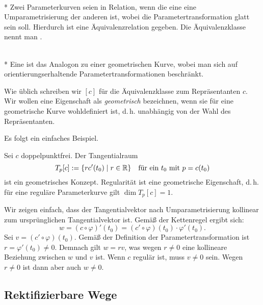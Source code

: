 \begin{definition}\mbox{}\\*
Zwei Parameterkurven seien in Relation, wenn die eine eine
Umparametrisierung der anderen ist, wobei die Parametertransformation
glatt sein soll. Hierdurch ist eine 
Äquivalenzrelation gegeben. Die Äquivalenzklasse nennt man
.
\end{definition}

\begin{definition}%
\mbox{}\\*
Eine  ist das Analogon zu einer
geometrischen Kurve, wobei man sich auf orientierungserhaltende
Parametertransformationen beschränkt.
\end{definition}

\noindent
Wie üblich schreiben wir $[c]$ für die Äquivalenzklasse zum
Repräsentanten $c$. Wir wollen eine Eigenschaft als
\emph{geometrisch} bezeichnen, wenn sie für eine geometrische Kurve
wohldefiniert ist, d.\,h. unabhängig von der Wahl des Repräsentanten.

Es folgt ein einfaches Beispiel.

\begin{corollary}
Sei $c$ doppelpunktfrei. Der Tangentialraum
\begin{equation}
T_p[c] := \{rc'(t_0)\mid r\in\mathbb R\}
\quad\text{für ein $t_0$ mit $p=c(t_0)$}
\end{equation}
ist ein geometrisches Konzept. Regularität ist eine geometrische
Eigenschaft, d.\,h. für eine reguläre Parameterkurve gilt
$\dim T_p[c]=1$.
\end{corollary}

\noindent{}
Wir zeigen einfach, dass der Tangentialvektor nach Umparametrisierung
kollinear zum ursprünglichen Tangentialvektor ist. Gemäß der
Kettenregel ergibt sich:%
\begin{equation}
w = (c\circ\varphi)'(t_0) = (c'\circ\varphi)(t_0)\cdot \varphi'(t_0).
\end{equation}
Sei $v=(c'\circ\varphi)(t_0)$. Gemäß der Definition der
Parametertransformation ist $r=\varphi'(t_0)\ne 0$. Demnach
gilt $w=rv$, was wegen $r\ne 0$ eine kollineare Beziehung zwischen
$w$ und $v$ ist. Wenn $c$ regulär ist, muss $v\ne 0$ sein.
Wegen $r\ne 0$ ist dann aber auch $w\ne 0$.\;\qedsymbol


\subsection{Rektifizierbare Wege}

